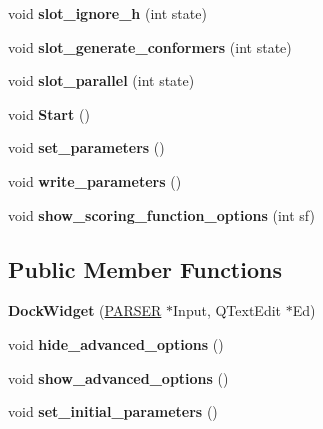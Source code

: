 \begin{DoxyCompactItemize}
\item 
\hypertarget{classDockWidget_aed37e253482f0a70e71366d9196e33a1}{
void {\bfseries slot\_\-ignore\_\-h} (int state)}
\label{classDockWidget_aed37e253482f0a70e71366d9196e33a1}

\item 
\hypertarget{classDockWidget_a1c5fcd15c38ef1fa202b17176ae70b4a}{
void {\bfseries slot\_\-generate\_\-conformers} (int state)}
\label{classDockWidget_a1c5fcd15c38ef1fa202b17176ae70b4a}

\item 
\hypertarget{classDockWidget_a3b8a148072524ad8aed315d5dc29fb33}{
void {\bfseries slot\_\-parallel} (int state)}
\label{classDockWidget_a3b8a148072524ad8aed315d5dc29fb33}

\item 
\hypertarget{classDockWidget_a8f01d3f6b6062ad465a6c769b167a354}{
void {\bfseries Start} ()}
\label{classDockWidget_a8f01d3f6b6062ad465a6c769b167a354}

\item 
\hypertarget{classDockWidget_a2fc1167c1f3f5049ebc9bbd30e2ebe6d}{
void {\bfseries set\_\-parameters} ()}
\label{classDockWidget_a2fc1167c1f3f5049ebc9bbd30e2ebe6d}

\item 
\hypertarget{classDockWidget_ab8441ca4582f8e702cd0ad876c5c6d70}{
void {\bfseries write\_\-parameters} ()}
\label{classDockWidget_ab8441ca4582f8e702cd0ad876c5c6d70}

\item 
\hypertarget{classDockWidget_a0a5a988e189b73cc911889fb1999fee6}{
void {\bfseries show\_\-scoring\_\-function\_\-options} (int sf)}
\label{classDockWidget_a0a5a988e189b73cc911889fb1999fee6}

\end{DoxyCompactItemize}
\subsection*{Public Member Functions}
\begin{DoxyCompactItemize}
\item 
\hypertarget{classDockWidget_a40507a87b30a60a3e1b592fa9fbc28bf}{
{\bfseries DockWidget} (\hyperlink{classPARSER}{PARSER} $\ast$Input, QTextEdit $\ast$Ed)}
\label{classDockWidget_a40507a87b30a60a3e1b592fa9fbc28bf}

\item 
\hypertarget{classDockWidget_a6989e94b4aec8d04fbdcb91adb853179}{
void {\bfseries hide\_\-advanced\_\-options} ()}
\label{classDockWidget_a6989e94b4aec8d04fbdcb91adb853179}

\item 
\hypertarget{classDockWidget_aeec35b446f045d15715cce59ee1f72bc}{
void {\bfseries show\_\-advanced\_\-options} ()}
\label{classDockWidget_aeec35b446f045d15715cce59ee1f72bc}

\item 
\hypertarget{classDockWidget_af53c4dc5533a5847d171eeefb5a48020}{
void {\bfseries set\_\-initial\_\-parameters} ()}
\label{classDockWidget_af53c4dc5533a5847d171eeefb5a48020}

\end{DoxyCompactItemize}
